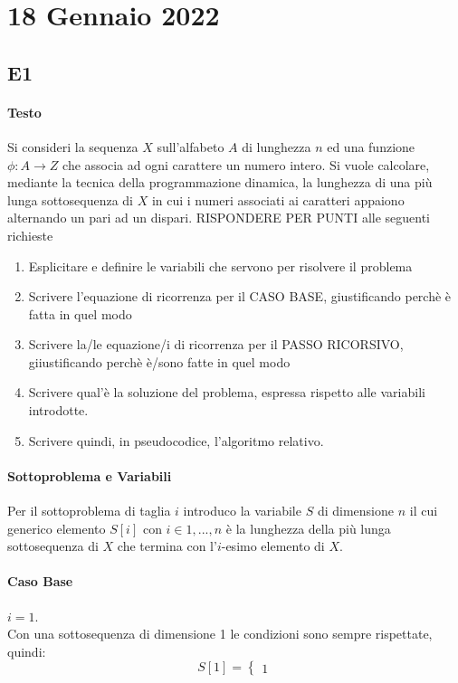 \documentclass[12pt, a4paper, openany]{book}
\begin{document}
\section*{18 Gennaio 2022}
\subsection*{E1}
\paragraph*{Testo}
Si consideri la sequenza $X$ sull'alfabeto $A$ di lunghezza $n$ ed una funzione $\phi:A\to Z$ che associa ad ogni carattere un numero intero.
Si vuole calcolare, mediante la tecnica della programmazione dinamica, la lunghezza di una più lunga sottosequenza di $X$ in cui i numeri associati ai caratteri appaiono alternando un pari ad un dispari.
RISPONDERE PER PUNTI alle seguenti richieste
\begin{enumerate}
	\item Esplicitare e definire le variabili che servono per risolvere il problema
	\item Scrivere l'equazione di ricorrenza per il CASO BASE, giustificando perchè è fatta in quel modo
	\item Scrivere la/le equazione/i di ricorrenza per il PASSO RICORSIVO, giiustificando perchè è/sono fatte in quel modo
	\item Scrivere qual'è la soluzione del problema, espressa rispetto alle variabili introdotte.
	\item Scrivere quindi, in pseudocodice, l'algoritmo relativo.
\end{enumerate}

\paragraph*{Sottoproblema e Variabili}
Per il sottoproblema di taglia $i$ introduco la variabile $S$ di dimensione $n$ il cui generico elemento
$S[i]$ con $i\in {1,...,n}$ è la lunghezza della più lunga sottosequenza di $X$ che termina con l'$i$-esimo elemento di $X$.

\paragraph*{Caso Base} $i=1$.
\\Con una sottosequenza di dimensione 1 le condizioni sono sempre rispettate, quindi:
$$
S[1]= \begin{cases}
	1
\end{cases}
$$
\end{document}
